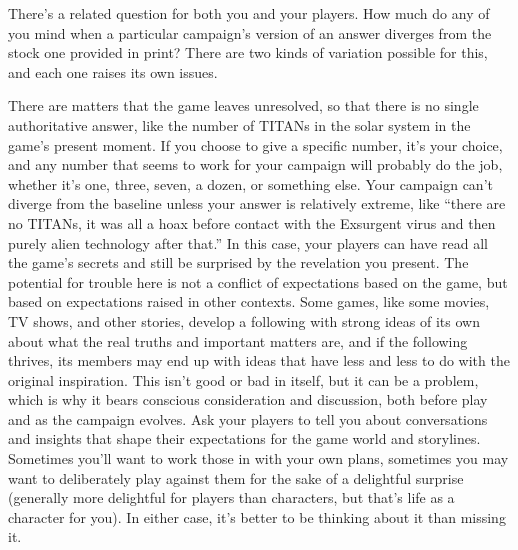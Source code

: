 There's a related question for both you and your 
players. How much do any of you mind when a particular
campaign's version of an answer diverges from
the stock one provided in print? There are two kinds 
of variation possible for this, and each one raises its 
own issues. 

There are matters that the game leaves unresolved, 
so that there is no single authoritative answer, like the 
number of TITANs in the solar system in the game's 
present moment. If you choose to give a specific 
number, it's your choice, and any number that seems 
to work for your campaign will probably do the job, 
whether it's one, three, seven, a dozen, or something 
else. Your campaign can't diverge from the baseline 
unless your answer is relatively extreme, like ``there 
are no TITANs, it was all a hoax before contact with 
the Exsurgent virus and then purely alien technology 
after that.'' In this case, your players can have read 
all the game's secrets and still be surprised by the revelation
you present. The potential for trouble here is
not a conflict of expectations based on the game, but 
based on expectations raised in other contexts. Some 
games, like some movies, TV shows, and other stories, 
develop a following with strong ideas of its own about 
what the real truths and important matters are, and if 
the following thrives, its members may end up with 
ideas that have less and less to do with the original 
inspiration. This isn't good or bad in itself, but it can 
be a problem, which is why it bears conscious consideration
and discussion, both before play and as the
campaign evolves. Ask your players to tell you about 
conversations and insights that shape their expectations
for the game world and storylines. Sometimes
you'll want to work those in with your own plans, 
sometimes you may want to deliberately play against 
them for the sake of a delightful surprise (generally 
more delightful for players than characters, but that's 
life as a character for you). In either case, it's better to 
be thinking about it than missing it. 

